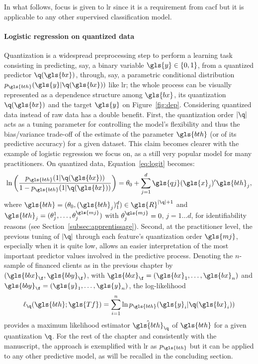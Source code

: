 In what follows, focus is given to \gls{lr} since it is a requirement from \gls{cacf} but it is applicable to any other supervised 
classification model.

\paragraph{Logistic regression on quantized data}

Quantization is a widespread preprocessing step to perform a learning task consisting in predicting, say, a binary variable $\gls{y}\in\{0,1\}$, from a quantized predictor  $\q(\gls{bx})$, through, say, a parametric conditional distribution $p_{\gls{bth}}(\gls{y}|\q(\gls{bx}))$ like \gls{lr}; the whole process can be visually represented as a dependence structure among $\gls{bx}$, its quantization $\q(\gls{bx})$
and the target $\gls{y}$ on Figure~\ref{fig:dep}. Considering quantized data instead of raw data has a double benefit. First, the quantization order $|\q|$ acts as a tuning parameter for controlling the model's flexibility and thus the bias/variance trade-off of the estimate of the parameter $\gls{bth}$ (or of its predictive accuracy) for a given dataset. This claim becomes clearer with the example of logistic regression we focus on, as a still very popular model for many practitioners. On quantized data, Equation~\eqref{eq:logit} becomes:
\begin{equation}
    \label{eq:reglogq}
\ln \left( \dfrac{p_{\gls{bth}}(1|\q(\gls{bx}))}{1 - p_{\gls{bth}}(1|\q(\gls{bx}))} \right) = \theta_0 + \sum_{j=1}^d \gls{qj}(\gls{x}_j)' \gls{bth}_j,
\end{equation}
where $\gls{bth} = (\theta_{0},(\gls{bth}_j)_1^d) \in \gls{R}^{|\q|+1}$ and $\gls{bth}_j = (\theta_{j}^{1},\dots,\theta_{j}^{\gls{mj}})$ with $\theta_{j}^{\gls{mj}} = 0$, $j=1 \ldots d$, for identifiability reasons (see Section~\ref{subsec:apprentissage}).
Second, at the practitioner level, the previous tuning of $|\q|$ through each feature's quantization order $\gls{mj}$, especially when it is quite low, allows an easier interpretation of the most important predictor values involved in the predictive process. Denoting the $n$-sample of financed clients as in the previous chapter by $(\gls{bbx}_{\f},\gls{bby}_{\f})$, with $\gls{bbx}_{\f}=(\gls{bx}_1,\ldots,\gls{bx}_n)$ and $\gls{bby}_{\f}=(\gls{y}_1,\ldots,\gls{y}_n)$, the log-likelihood 
\begin{equation}
\label{eq:lq}
\ell_{\q}(\gls{bth} ; \gls{Tf})=\sum_{i=1}^n \ln p_{\gls{bth}}(\gls{y}_i|\q(\gls{bx}_i))
\end{equation}
provides a maximum likelihood estimator $\hat{\gls{bth}}_{\q}$ of $\gls{bth}$ for a given quantization $\q$. For the rest of the chapter and consistently with the manuscript, the approach is exemplified with \gls{lr} as $p_{\gls{bth}}$ but it can be applied to any other predictive model, as will be recalled in the concluding section.

